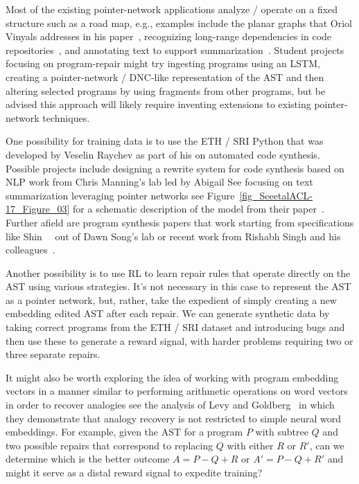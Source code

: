 Most of the existing pointer-network applications analyze / operate on a fixed structure such as a road map, e.g., examples include the planar graphs that Oriol Vinyals addresses in his paper~\cite{VinyalsetalNIPS-15}, recognizing long-range dependencies in code repositories~\cite{BhoopchandetalICLR-17}, and annotating text to support summarization~\cite{SeeetalACL-17}. Student projects focusing on program-repair might try ingesting programs using an LSTM, creating a pointer-network / DNC-like representation of the AST and then altering selected programs by using fragments from other programs, but be advised this approach will likely require inventing extensions to existing pointer-network techniques.

One possibility for training data is to use the ETH / SRI Python {} that was developed by Veselin Raychev as part of his {} on automated code synthesis. Possible projects include designing a rewrite system for code synthesis based on NLP work from Chris Manning's lab led by Abigail See focusing on text summarization leveraging pointer networks \emdash{} see Figure~\ref{fig_SeeetalACL-17_Figure_03} for a schematic description of the model from their paper~\cite{SeeetalACL-17}. Further afield are program synthesis papers that work starting from specifications like Shin~\etal{}~\cite{ShinetalICLR-18b} out of Dawn Song's lab or recent work from Rishabh Singh and his colleagues~\cite{WangetalCoRR-17}.

Another possibility is to use RL to learn repair rules that operate directly on the AST using various strategies. It's not necessary in this case to represent the AST as a pointer network, but, rather, take the expedient of simply creating a new embedding edited AST after each repair. We can generate synthetic data by taking correct programs from the ETH / SRI dataset and introducing bugs and then use these to generate a reward signal, with harder problems requiring two or three separate repairs. 

It might also be worth exploring the idea of working with program embedding vectors in a manner similar to performing arithmetic operations on word vectors in order to recover analogies \emdash{} see the analysis of Levy and Goldberg~\cite{LevyandGoldbergCONIL-14} in which they demonstrate that analogy recovery is not restricted to simple neural word embeddings. For example, given the AST for a program $P$ with subtree $Q$ and two possible repairs that correspond to replacing $Q$ with either $R$ or $R'$, can we determine which is the better outcome $A = P - Q + R$ or $A' = P - Q + R'$ and might it serve as a distal reward signal to expedite training?

